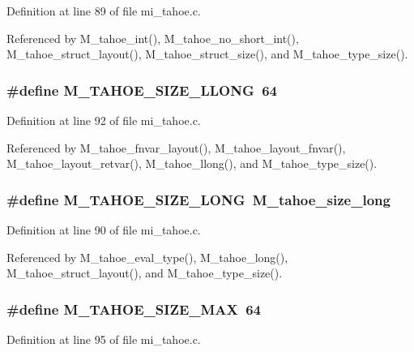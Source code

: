 Definition at line 89 of file mi\_\-tahoe.c.

Referenced by M\_\-tahoe\_\-int(), M\_\-tahoe\_\-no\_\-short\_\-int(), M\_\-tahoe\_\-struct\_\-layout(), M\_\-tahoe\_\-struct\_\-size(), and M\_\-tahoe\_\-type\_\-size().
\subsubsection{\setlength{\rightskip}{0pt plus 5cm}\#define M\_\-TAHOE\_\-SIZE\_\-LLONG~64}\label{mi__tahoe_8c_ffa318c51db26d3b28a68e0f70df4bbd}




Definition at line 92 of file mi\_\-tahoe.c.

Referenced by M\_\-tahoe\_\-fnvar\_\-layout(), M\_\-tahoe\_\-layout\_\-fnvar(), M\_\-tahoe\_\-layout\_\-retvar(), M\_\-tahoe\_\-llong(), and M\_\-tahoe\_\-type\_\-size().
\subsubsection{\setlength{\rightskip}{0pt plus 5cm}\#define M\_\-TAHOE\_\-SIZE\_\-LONG~\bf{M\_\-tahoe\_\-size\_\-long}}\label{mi__tahoe_8c_b73eaefb0529ab2ab88b2a0ff59627ab}




Definition at line 90 of file mi\_\-tahoe.c.

Referenced by M\_\-tahoe\_\-eval\_\-type(), M\_\-tahoe\_\-long(), M\_\-tahoe\_\-struct\_\-layout(), and M\_\-tahoe\_\-type\_\-size().
\subsubsection{\setlength{\rightskip}{0pt plus 5cm}\#define M\_\-TAHOE\_\-SIZE\_\-MAX~64}\label{mi__tahoe_8c_34f9aca61d9507af47c474676c3a7ff7}




Definition at line 95 of file mi\_\-tahoe.c.
